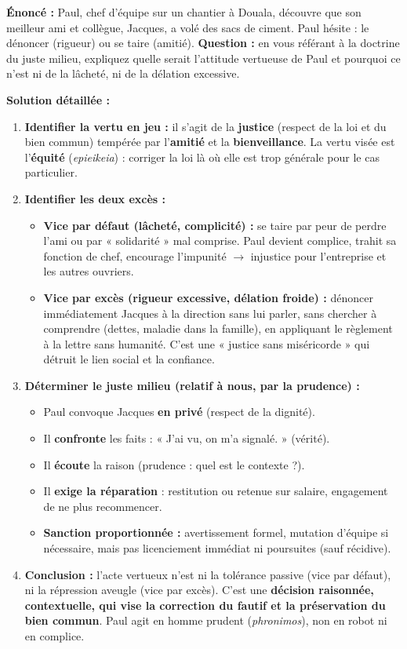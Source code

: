 \documentclass[11pt]{article}
\begin{document}
\begin{exoresolu}
\textbf{Énoncé :} Paul, chef d'équipe sur un chantier à Douala, découvre que son meilleur ami et collègue, Jacques, a volé des sacs de ciment. Paul hésite : le dénoncer (rigueur) ou se taire (amitié).
\textbf{Question :} en vous référant à la doctrine du juste milieu, expliquez quelle serait l'attitude vertueuse de Paul et pourquoi ce n'est ni de la lâcheté, ni de la délation excessive.

\tcblower
\textbf{Solution détaillée :}
\begin{enumerate}
    \item \textbf{Identifier la vertu en jeu :} il s'agit de la \textbf{justice} (respect de la loi et du bien commun) tempérée par l'\textbf{amitié} et la \textbf{bienveillance}. La vertu visée est l'\textbf{équité} (\emph{epieikeia}) : corriger la loi là où elle est trop générale pour le cas particulier.
    \item \textbf{Identifier les deux excès :}
    \begin{itemize}
        \item \textbf{Vice par défaut (lâcheté, complicité) :} se taire par peur de perdre l'ami ou par « solidarité » mal comprise. Paul devient complice, trahit sa fonction de chef, encourage l'impunité $\rightarrow$ injustice pour l'entreprise et les autres ouvriers.
        \item \textbf{Vice par excès (rigueur excessive, délation froide) :} dénoncer immédiatement Jacques à la direction sans lui parler, sans chercher à comprendre (dettes, maladie dans la famille), en appliquant le règlement à la lettre sans humanité. C'est une « justice sans miséricorde » qui détruit le lien social et la confiance.
    \end{itemize}
    \item \textbf{Déterminer le juste milieu (relatif à nous, par la prudence) :}
    \begin{itemize}
        \item Paul convoque Jacques \textbf{en privé} (respect de la dignité).
        \item Il \textbf{confronte} les faits : « J'ai vu, on m'a signalé. » (vérité).
        \item Il \textbf{écoute} la raison (prudence : quel est le contexte ?).
        \item Il \textbf{exige la réparation} : restitution ou retenue sur salaire, engagement de ne plus recommencer.
        \item \textbf{Sanction proportionnée :} avertissement formel, mutation d'équipe si nécessaire, mais pas licenciement immédiat ni poursuites (sauf récidive).
    \end{itemize}
    \item \textbf{Conclusion :} l'acte vertueux n'est ni la tolérance passive (vice par défaut), ni la répression aveugle (vice par excès). C'est une \textbf{décision raisonnée, contextuelle, qui vise la correction du fautif et la préservation du bien commun}. Paul agit en homme prudent (\emph{phronimos}), non en robot ni en complice.
\end{enumerate}
\end{exoresolu}
\end{document}
